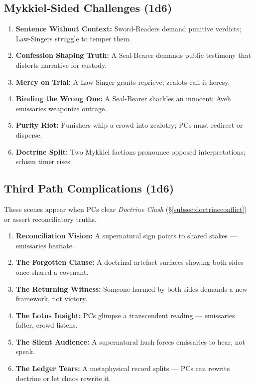 \documentclass[11pt]{article}
\begin{document}
\subsection{Mykkiel-Sided Challenges (1d6)}

\begin{enumerate}[leftmargin=*]
  \item \textbf{Sentence Without Context:} Sword-Readers demand punitive
        verdicts; Law-Singers struggle to temper them.
  \item \textbf{Confession Shaping Truth:} A Seal-Bearer demands public
        testimony that distorts narrative for custody.
  \item \textbf{Mercy on Trial:} A Law-Singer grants reprieve; zealots
        call it heresy.
  \item \textbf{Binding the Wrong One:} A Seal-Bearer shackles an
        innocent; Aveh emissaries weaponize outrage.
  \item \textbf{Purity Riot:} Punishers whip a crowd into zealotry;
        PCs must redirect or disperse.
  \item \textbf{Doctrine Split:} Two Mykkiel factions pronounce opposed
        interpretations; schism timer rises.
\end{enumerate}

\subsection{Third Path Complications (1d6)}

These scenes appear when PCs clear \emph{Doctrine Clash}
(\S\ref{subsec:doctrineconflict}) or assert reconciliatory truths.

\begin{enumerate}[leftmargin=*]
  \item \textbf{Reconciliation Vision:} A supernatural sign points to
        shared stakes --- emissaries hesitate.
  \item \textbf{The Forgotten Clause:} A doctrinal artefact surfaces
        showing both sides once shared a covenant.
  \item \textbf{The Returning Witness:} Someone harmed by both sides
        demands a new framework, not victory.
  \item \textbf{The Lotus Insight:} PCs glimpse a transcendent reading
        --- emissaries falter, crowd listens.
  \item \textbf{The Silent Audience:} A supernatural hush forces emissaries
        to hear, not speak.
  \item \textbf{The Ledger Tears:} A metaphysical record splits --- PCs
        can rewrite doctrine or let chaos rewrite it.
\end{enumerate}
\end{document}
